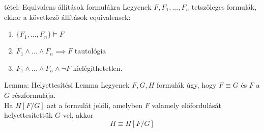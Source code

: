 \documentclass{beamer}
\begin{document}
\begin{frame}

\begin{block}{tétel: Equivalens állítások formulákra}
Legyenek $F, F_1, ... , F_n$ tetszőleges formulák, ekkor a következő állítások equivalensek:

\begin{enumerate}
\item $\{F_1, ... , F_n\} \models F$
\item $F_1 \land ... \land F_n \implies F$ tautológia
\item $F_1 \land ... \land F_n \land \neg F$ kielégíthetetlen.
\end{enumerate}

\end{block}

\end{frame}

\begin{frame}

\begin{block}{Lemma: Helyettesítési Lemma}
Legyenek $F, G, H$ formulák úgy, hogy $F \equiv G$ és $F$ a $G$ részformulája.\\
Ha $H[F/G]$ azt a formulát jelöli, amelyben $F$ valamely előfordulását helyettesítettük $G$-vel, akkor
$$H \equiv H[F/G]$$

\end{block}

\end{frame}
\end{document}
